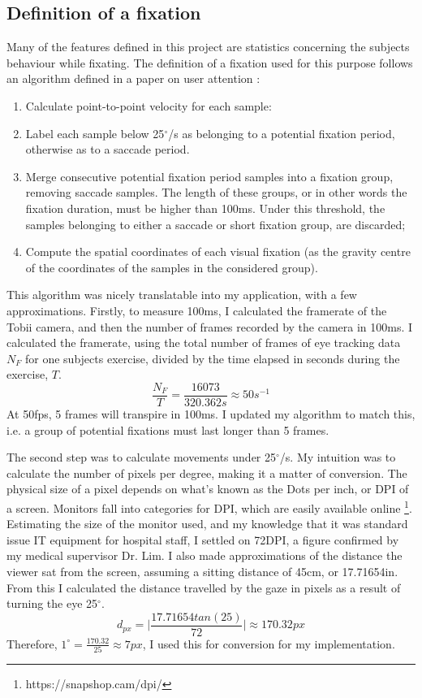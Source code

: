 \documentclass{report}
\begin{document}
{			\subsection{Definition of a fixation}
				Many of the features defined in this project are statistics concerning the subjects behaviour while fixating. The definition of a fixation used for this purpose follows an algorithm defined in a paper on user attention \cite{overtva}:
				\begin{enumerate}
					\item{Calculate point-to-point velocity for each sample: }
					\item{Label each sample below 25$^{\circ}$/s as belonging to a potential fixation period, otherwise as to a saccade period.}
					\item{Merge consecutive potential fixation period samples into a fixation group, removing saccade samples. The length of these groups, or in other words the fixation duration, must be higher than 100ms. Under this threshold, the samples belonging to either a saccade or short fixation group, are discarded;}
					\item{Compute the spatial coordinates of each visual fixation (as the gravity centre of the coordinates of the samples in the considered group).}
				\end{enumerate}
				This algorithm was nicely translatable into my application, with a few approximations. Firstly, to measure 100ms, I calculated the framerate of the Tobii camera, and then the number of frames recorded by the camera in 100ms. I calculated the framerate, using the total number of frames of eye tracking data \(N_{F}\) for one subjects exercise, divided by the time elapsed in seconds during the exercise, \(T\).
				\[\frac{N_{F}}{T} = \frac{16073}{320.362s} \approx 50s^{-1}\]
				At 50fps, 5 frames will transpire in 100ms. I updated my algorithm to match this, i.e. a group of potential fixations must last longer than 5 frames. 
				
				The second step was to calculate movements under 25$^{\circ}$/s. My intuition was to calculate the number of pixels per degree, making it a matter of conversion. The physical size of a pixel depends on what's known as the Dots per inch, or DPI of a screen. Monitors fall into categories for DPI, which are easily available online \footnote[1]{https://snapshop.cam/dpi/}. Estimating the size of the monitor used, and my knowledge that it was standard issue IT equipment for hospital staff, I settled on 72DPI, a figure confirmed by my medical supervisor Dr. Lim. I also made approximations of the distance the viewer sat from the screen, assuming a sitting distance of 45cm, or 17.71654in. From this I calculated the distance travelled by the gaze in pixels as a result of turning the eye 25$^{\circ}$.
				\[d_{px} = \lvert{\frac{17.71654 tan(25)}{72}}\rvert \approx 170.32px\]
				Therefore, \(1^{\circ} = \frac{170.32}{25} \approx 7px\), I used this for conversion for my implementation.

}
\end{document}

